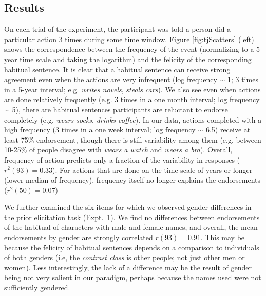\documentclass[10pt,letterpaper]{article}
\begin{document}
\subsection{Results}
On each trial of the experiment, the participant was told a person did a particular action 3 times during some time window. 
Figure \ref{fig:tjScatters} (left) shows the correspondence between the frequency of the event (normalizing to a 5-year time scale and taking the logarithm) and the felicity of the corresponding habitual sentence. 
It is clear that a habitual sentence can receive strong agreement even when the actions are very infrequent (log frequency $\sim$ 1; 3 times in a 5-year interval; e.g. \emph{writes novels}, \emph{steals cars}).
We also see even when actions are done relatively frequently (e.g. 3 times in a one month interval; log frequency $\sim$ 5), there are habitual sentences participants are reluctant to endorse completely (e.g. \emph{wears socks}, \emph{drinks coffee}). 
In our data, actions completed with a high frequency (3 times in a one week interval; log frequency $\sim$ 6.5) receive at least 75\% endorsement, though there is still variability among them (e.g. between 10-25\% of people disagree with \emph{wears a watch} and \emph{wears a bra}). %
Overall, frequency of action predicts only a fraction of the variability in responses ($r^2(93) = 0.33$).
For actions that are done on the time scale of years or longer (lower median of frequency), frequency itself no longer explains the endorsements ($r^2(50) = 0.07$)

We further examined the six items for which we observed gender differences in the prior elicitation task (Expt.~1).
We find no differences between endorsements of the habitual of characters with male and female names, and overall, the mean endorsements by gender are strongly correlated $r(93) = 0.91$. 
This may be because the felicity of habitual sentences depends on a comparison to individuals of both genders (i.e, the \emph{contrast class} is other people; not just other men or women). 
Less interestingly, the lack of a difference may be the result of gender being not very salient in our paradigm, perhaps because the names used were not sufficiently gendered.
\end{document}
